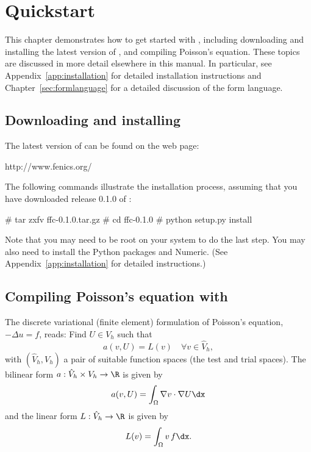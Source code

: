 \chapter{Quickstart}

This chapter demonstrates how to get started with \ffc{}, including
downloading and installing the latest version of \ffc{}, and compiling
Poisson's equation. These topics are discussed in more detail
elsewhere in this manual. In particular, see
Appendix~\ref{app:installation} for detailed installation instructions
and Chapter~\ref{sec:formlanguage} for a detailed discussion of the
form language.

\section{Downloading and installing \ffc{}}

The latest version of \ffc{} can be found on the \fenics{} web page:
\begin{code}
  http://www.fenics.org/
\end{code}
The following commands illustrate the installation process, assuming
that you have downloaded release 0.1.0 of \ffc{}:
\begin{code}
  # tar zxfv ffc-0.1.0.tar.gz
  # cd ffc-0.1.0
  # python setup.py install
\end{code}

Note that you may need to be root on your system to do the last
step. You may also need to install the Python packages \fiat{} and
Numeric. (See Appendix~\ref{app:installation} for detailed instructions.)

\section{Compiling Poisson's equation with \ffc{}}

The discrete variational (finite element) formulation of Poisson's
equation, $-\Delta u = f$, reads: Find $U \in V_h$ such that
\begin{equation} \label{eq:varform}
  a(v, U) = L(v) \quad \forall v\in \hat{V}_h, 
\end{equation}
with $(\hat{V}_h, V_h)$ a pair of suitable function spaces (the test and
trial spaces). The bilinear form $a : \hat{V}_h \times V_h \rightarrow
\R$ is given by
\begin{equation}
  a(v, U) = \int_{\Omega} \nabla v \cdot \nabla U \dx
\end{equation}
and the linear form $L : \hat{V}_h \rightarrow \R$ is given by
\begin{equation}
  L(v) = \int_{\Omega} v \, f \dx.
\end{equation}

